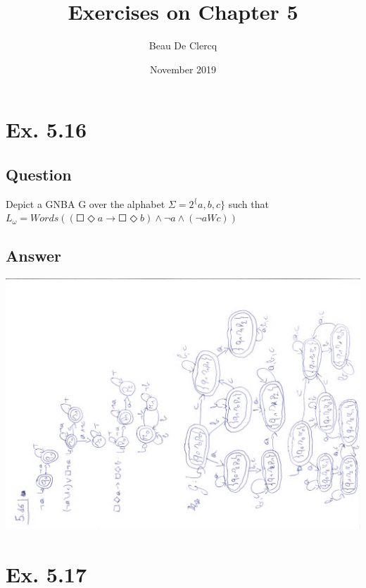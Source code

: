 \documentclass[12pt]{article}
\title{Exercises on Chapter 5}
\author{Beau De Clercq}
\date{November 2019}
\begin{document}
\maketitle{}


\clearpage
\newpage

\section*{Ex. 5.16}
\subsection*{Question}
Depict a GNBA G over the alphabet $\Sigma = 2^\{ a,b,c \}$ such that\\
$L_\omega = Words((\Square \Diamond a \rightarrow \Square \Diamond b) \wedge \neg a \wedge (\neg a W c))$

\subsection*{Answer}
\includegraphics*[angle=270, scale=0.7]{ex516.pdf}


\newpage
\section*{Ex. 5.17}
\end{document}
